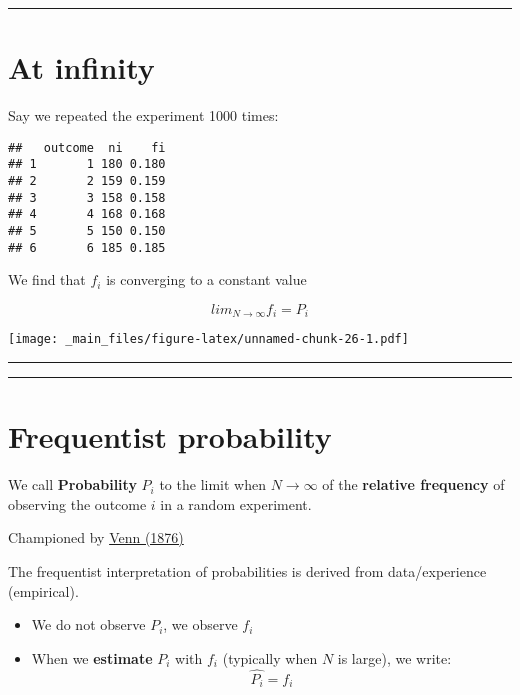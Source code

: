 \documentclass[
]{book}
\providecommand{\tightlist}{%
  \setlength{\itemsep}{0pt}\setlength{\parskip}{0pt}}
\begin{document}
\begin{center}\rule{0.5\linewidth}{0.5pt}\end{center}

\hypertarget{at-infinity}{%
\section{At infinity}\label{at-infinity}}

Say we repeated the experiment 1000 times:

\begin{verbatim}
##   outcome  ni    fi
## 1       1 180 0.180
## 2       2 159 0.159
## 3       3 158 0.158
## 4       4 168 0.168
## 5       5 150 0.150
## 6       6 185 0.185
\end{verbatim}

We find that \(f_i\) is converging to a constant value

\[lim_{N\rightarrow \infty} f_i = P_i\]

\texttt{[image: \_main\_files/figure-latex/unnamed-chunk-26-1.pdf]}

\begin{center}\rule{0.5\linewidth}{0.5pt}\end{center}

\begin{center}\rule{0.5\linewidth}{0.5pt}\end{center}

\hypertarget{frequentist-probability}{%
\section{Frequentist probability}\label{frequentist-probability}}

We call \textbf{Probability} \(P_i\) to the limit when \(N \rightarrow \infty\) of the \textbf{relative frequency} of observing the outcome \(i\) in a random experiment.

Championed by \href{https://plato.stanford.edu/entries/probability-interpret/\#ClaPro}{Venn (1876)}

The frequentist interpretation of probabilities is derived from data/experience (empirical).

\begin{itemize}
\tightlist
\item
  We do not observe \(P_i\), we observe \(f_i\)
\item
  When we \textbf{estimate} \(P_i\) with \(f_i\) (typically when \(N\) is large), we write: \[\hat{P_i}=f_i\]
\end{itemize}
\end{document}
